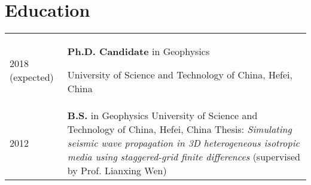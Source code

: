 \section*{Education}
\begin{tabular}{p{} p{}}
2018 (expected) & \textbf{Ph.D. Candidate} in Geophysics
                  \par University of Science and Technology of China, Hefei, China\\
2012 & \textbf{B.S.} in Geophysics
       \newline
       University of Science and Technology of China, Hefei, China
       \newline
       Thesis: \textit{Simulating seismic wave propagation in 3D heterogeneous isotropic media \newline
       using staggered-grid finite differences}
       (supervised by Prof. Lianxing Wen)
\end{tabular}
